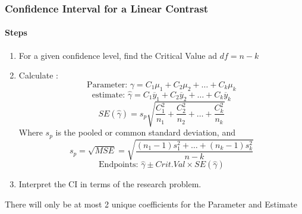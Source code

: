 \documentclass[../STAT-252-Notes.tex]{subfiles}
\begin{document}
\subsubsection{Confidence Interval for a Linear Contrast}
\paragraph{Steps}
\begin{enumerate}
  \item For a given confidence level, find the Critical Value ad $df = n - k$
  \item Calculate :~\\
    \[ 
     \text{Parameter: } \gamma = C_1\mu_1 + C_2\mu_2 + \dots + C_k\mu_k 
    \] 
   \[ 
      \text{estimate: } \hat{\gamma} = C_1\overline{y}_1 + C_2\overline{y}_2 + \ldots + C_k\overline{y}_k 
    \] 
    \[ 
      SE(\hat{\gamma}) = s_p \sqrt{\frac{C_1^{2}}{n_1} + \frac{C_2^{2}}{n_2}+\ldots+\frac{C_k^{2}}{n_k}}     
    \] 
    Where $s_p$ is the pooled or common standard deviation, and 
    \[ 
      s_p = \sqrt{MSE}  = \sqrt{\frac{(n_1-1)s_1^{2} + \ldots + (n_k - 1)s_k^{2}}{n-k} }
    \] 
    \[ 
      \text{Endpoints: } \hat{\gamma}\pm Crit.Val \times SE(\hat{\gamma}  ) 
    \] 
      
  \item Interpret the CI in terms of the research problem.
\end{enumerate}
\begin{Note}
  There will only be at most 2 unique coefficients for the Parameter and Estimate
\end{Note}
\end{document}
